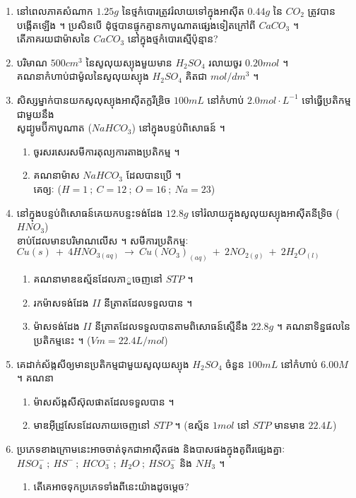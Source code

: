 \documentclass[a4paper]{report}
\begin{document}
\begin{enumerate}[1]
		\item នៅពេលភាគសំណាក $1.25g$ នៃថ្មកំបោរត្រូវរំលាយទៅក្នុងអាស៊ីត $0.44g$ នៃ $CO_2$ ត្រូវបានបង្កើតឡើង ។ ប្រសិនបើ ដុំថ្មបានផ្ទុកគ្មានកាបូណាតផ្សេងទៀតក្រៅពី $CaCO_3$ ។\\
		តើភាគរយជាម៉ាសនៃ $CaCO_3$ នៅក្នុងថ្មកំបោរស្មើប៉ុន្មាន?
		\item បរិមាណ $500cm^3$ នៃសូលុយស្យុងមួយមាន $H_2SO_4$ រលាយចូរ $0.20mol$ ។\\
		គណនាកំហាប់ជាម៉ូលនៃសូលុយស្យុង $H_2SO_4$ គិតជា $mol/dm^3$ ។
		\item សិស្សម្នាក់បានយកសូលុស្យុងអាស៊ីតក្លរីឌ្រិច $100mL$ នៅកំហាប់ $2.0mol\cdot L^{-1}$ ទៅធ្វើប្រតិកម្មជាមួយនឹង\\ សូដ្យូមប៊ីកាបូណាត ($NaHCO_3$) នៅក្នុងបន្ទប់ពិសោធន៍ ។
		\begin{enumerate}[a]
			\item ចូរសរសេរសមីការតុល្យការតាងប្រតិកម្ម ។
			\item គណនាម៉ាស $NaHCO_3$ ដែលបានប្រើ ។\\
			គេឲ្យៈ ($H=1~;~C=12~;~O=16~;~Na=23$)
		\end{enumerate}
		\item នៅក្នុងបន្ទប់ពិសោធន៍គេយកបន្ទះទង់ដែង $12.8g$ ទៅរំលាយក្នុងសូលុយស្យុងអាស៊ីតនីទ្រិច ($HNO_3$)\\ ខាប់ដែលមានបរិមាណលើស ។
		សមីការប្រតិកម្មៈ $Cu{(s)}~+~4HNO_{3(aq)}~\rightarrow~Cu(NO_3)_{(aq)}~+~2NO_{2(g)}~+~2H_2O_{(l)}$
		\begin{enumerate}[a]
			\item គណនាមាឌឧស្ម័នដែលភាួចេញនៅ $STP$ ។
			\item រកម៉ាសទង់ដែង $II$ នីត្រាតដែលទទួលបាន ។
			\item ម៉ាសទង់ដែង $II$ នីត្រាតដែលទទួលបានតាមពិសោធន៍ស្មើនឹង $22.8g$ ។ គណនាទិន្នផលនៃប្រតិកម្មនេះ ។ ($Vm=22.4L/mol$)
		\end{enumerate}
		\item គេដាក់ស័ង្កសីឲ្យមានប្រតិកម្មជាមួយសូលុយស្យុង $H_2SO_4$ ចំនួន $100mL$ នៅកំហាប់ $6.00M$ ។ គណនា
		\begin{enumerate}[a]
			\item ម៉ាសស័ង្កសីស៊ុលផាតដែលទទួលបាន ។
			\item មាឌអ៊ីដ្រូសែនដែលភាយចេញនៅ $STP$ ។ (ឧស្ម័ន $1mol$ នៅ $STP$ មានមាឌ $22.4L$) 
		\end{enumerate}
		\item ប្រភេទខាងក្រោមនេះអាចចាត់ទុកជាអាស៊ីតផង និងបាសផងក្នុងគូពីរផ្សេងគ្នាៈ $HSO^-_4~;~HS^-~;~HCO^-_3~;~H_2O~;~HSO^-_3$ និង $NH_3$ ។
		\begin{enumerate}[a]
			\item តើគេអាចទុកប្រភេទទាំងពីនេះយ៉ាងដូចម្តេច?

\end{enumerate}
\end{enumerate}
\end{document}
